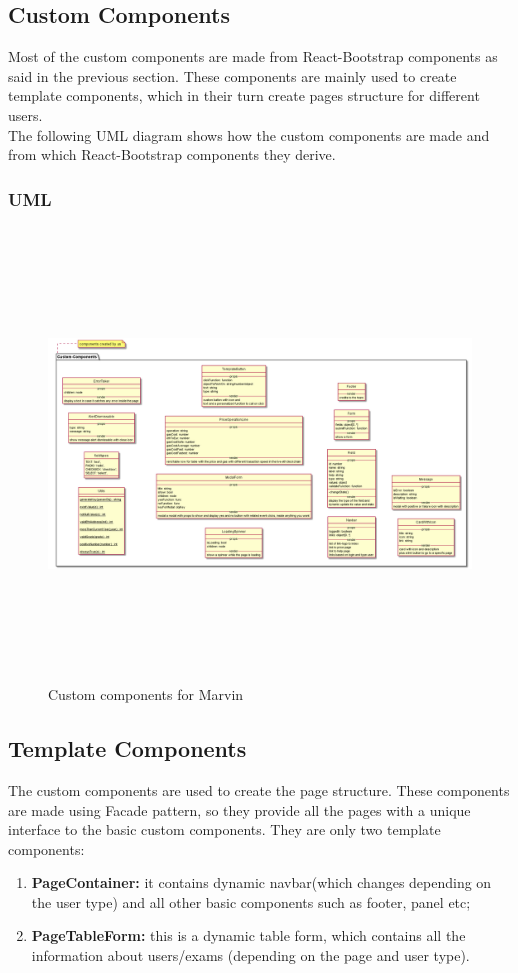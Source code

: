 \documentclass[../react]{subfiles}
\begin{document}
	\subsection{Custom Components} Most of the custom components are made from React-Bootstrap components as said in the previous section. These components are mainly used to create template components, which in their turn create pages structure for different users. \\The following UML diagram shows how the custom components are made and from which React-Bootstrap components they derive.  
	\\ 
		\subsubsection{UML}
			\begin{figure}[h]
			\centering
			\includegraphics[width=15.5cm,height=12cm]{"diagrammi/react/customComponents"}
			\caption{Custom components for Marvin}
			\label{fig:Custom components for Marvin}
		\end{figure}
	\subsection{Template Components} The custom components are used to create the page structure. These components are made using Facade pattern, so 
	they provide all the pages with a unique interface to the basic custom components. They are only two template components: \begin{enumerate}
		\item \textbf{PageContainer: } it contains dynamic navbar(which changes depending on the user type) and all other basic components such as footer, panel etc;
		\item \textbf{PageTableForm: }this is a dynamic table form, which contains all the information about users/exams (depending on the page and user type).
	\end{enumerate} 
\end{document}
